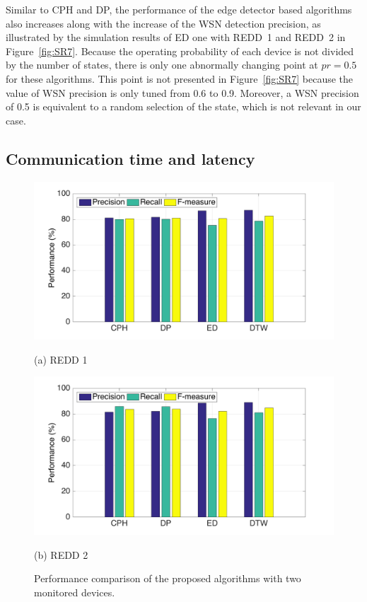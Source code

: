 Similar to CPH and DP, the performance of the edge detector based algorithms also increases along with the increase of the WSN detection precision, as illustrated by the simulation results of ED one with REDD~1 and REDD~2 in Figure~\ref{fig:SR7}. Because the operating probability of each device is not divided by the number of states, there is only one abnormally changing point at $pr=0.5$ for these algorithms. This point is not presented in Figure~\ref{fig:SR7} because the value of WSN precision is only tuned from 0.6 to 0.9. Moreover, a WSN precision of 0.5 is equivalent to a random selection of the state, which is not relevant in our case.





\subsection{Communication time and latency}
\begin{figure}[htb]

\begin{minipage}[b]{1\linewidth}
  \centering
  \centerline{\includegraphics[width=.75\textwidth]{./chapters/chapter5/images/R1_perfcom.pdf}}
  \centerline{(a) REDD 1}\medskip
\end{minipage}
%
\hfill
\begin{minipage}[b]{1\linewidth}
  \centering
  \centerline{\includegraphics[width=.75\textwidth]{./chapters/chapter5/images/R2_perfcom.pdf}}
  \centerline{(b) REDD 2}\medskip
\end{minipage}
\caption{Performance comparison of the proposed algorithms with two monitored devices.}
\label{fig:SR8}
%
\end{figure}

